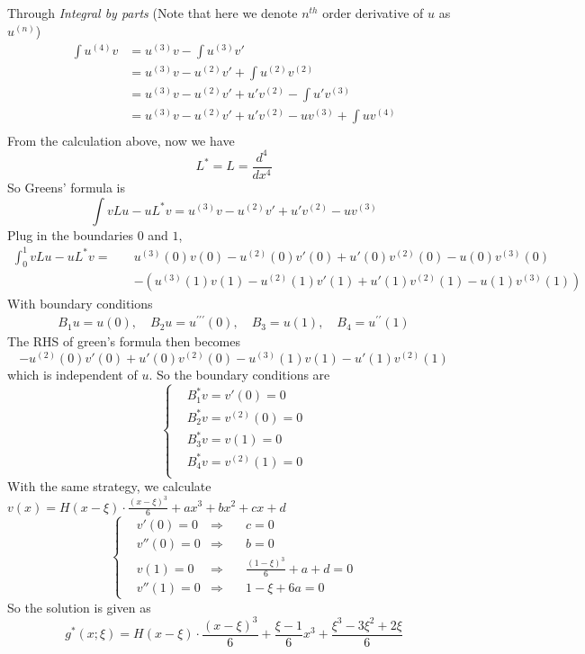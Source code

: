 \documentclass{article}
\begin{document}
\subsection{}
Through \textit{Integral by parts} (Note that here we denote $n^{th}$ order derivative of $u$ as $u^{(n)}$)
\begin{align*}
\int u^{(4)}v &=u^{(3)}v -\int u^{(3)}v' \\
&=u^{(3)}v - u^{(2)}v' + \int u^{(2)}v^{(2)} \\
&=u^{(3)}v - u^{(2)}v' + u'v^{(2)}-\int u'v^{(3)} \\
&=u^{(3)}v - u^{(2)}v' + u'v^{(2)}-uv^{(3)} +\int uv^{(4)} \\
\end{align*}
From the calculation above, now we have 
\[
	L^* = L =  \frac{d^4}{dx^4}
\]	
So Greens' formula is
\[
	\int vLu-uL^*v = u^{(3)}v - u^{(2)}v' + u'v^{(2)}-uv^{(3)}
\]
Plug in the boundaries $0$ and $1$,
\[\begin{aligned}
	\int_0^1 vLu-uL^*v =\quad& u^{(3)}(0)v(0) - u^{(2)}(0)v'(0) + u'(0)v^{(2)}(0)-u(0)v^{(3)}(0)\\& - \left(u^{(3)}(1)v(1) - u^{(2)}(1)v'(1) + u'(1)v^{(2)}(1)-u(1)v^{(3)}(1)\right)
\end{aligned}
\]
With boundary conditions 
\begin{align*}
B_{1} u=u(0), \quad B_{2} u=u^{\prime \prime \prime}(0), \quad B_{3}=u(1), \quad B_{4}=u^{\prime \prime}(1)
\end{align*}
The RHS of green's formula then becomes
\[
	- u^{(2)}(0)v'(0) + u'(0)v^{(2)}(0)-u^{(3)}(1)v(1)-u'(1)v^{(2)}(1)
\]
which is independent of $u$. So the boundary conditions are 
\[
	\left\{
	\begin{aligned}
	&B_1^* v = v'(0) = 0\\
	&B_2^* v = v^{(2)}(0) = 0\\
	&B_3^* v = v(1) = 0\\
	&B_4^* v = v^{(2)}(1) = 0\\
	\end{aligned}
	\right.
\]
With the same strategy, we calculate $v(x) = H(x-\xi) \cdot \frac{(x-\xi)^3}{6}+ a x^3 + bx^2+cx+d$
\[\left\{
	\begin{aligned}
	&v'(0) = 0     &\Rightarrow \quad& c = 0\\
	&v''(0) = 0  &\Rightarrow \quad&b = 0 \\
	&v(1) = 0     &\Rightarrow \quad&\frac{(1-\xi)^3}{6}+a+d = 0\\
	&v''(1) = 0   &\Rightarrow \quad&1-\xi+6a = 0 
	\end{aligned}
  \right.
\]
So the solution is given as 
\[
	g^*(x;\xi) = H(x-\xi) \cdot \frac{(x-\xi)^3}{6}+ \frac{\xi-1}{6} x^3+\frac{\xi^3-3\xi^2+2\xi}{6}
\]
\end{document}
